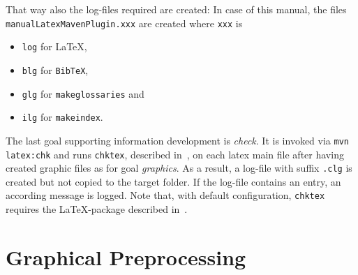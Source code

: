\documentclass[12pt]{book}
\begin{document}

That way also the log-files required are created: 
In case of this manual, 
the files \texttt{manualLatexMavenPlugin.xxx} are created 
where \texttt{xxx} is 
%
\begin{itemize}
\item
\texttt{log} for \LaTeX, 
\item
\texttt{blg} for \texttt{BibTeX}, 
\item
\texttt{glg} for \texttt{makeglossaries} and 
\item
\texttt{ilg} for \texttt{makeindex}. 
\end{itemize}

The last goal supporting information development is {\em check}. 
It is invoked via \texttt{mvn latex:chk} 
and runs \texttt{chktex}, described in~\cite{ChkTeX}, 
on each latex main file 
after having created graphic files as for goal {\em graphics}. 
As a result, a log-file with suffix \texttt{.clg} is created 
but not copied to the target folder. 
If the log-file contains an entry, 
an according message is logged. 
Note that, with default configuration, 
\texttt{chktex} requires the \LaTeX-package  
described in~\cite{BooktP}. 


\chapter{Graphical Preprocessing}\label{chap:GraphConversions}
\end{document}
